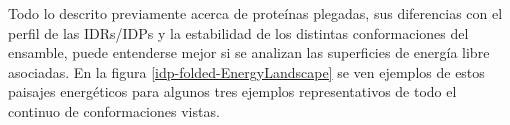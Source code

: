 % 

















Todo lo descrito previamente acerca de proteínas plegadas, sus diferencias con el perfil de las IDRs/IDPs y la estabilidad de los distintas conformaciones del ensamble, 
puede entenderse mejor si se analizan las superficies de energía libre asociadas. 
En la figura \ref{idp-folded-EnergyLandscape} se ven ejemplos de estos paisajes energéticos para algunos tres ejemplos representativos de todo el continuo de conformaciones vistas.

